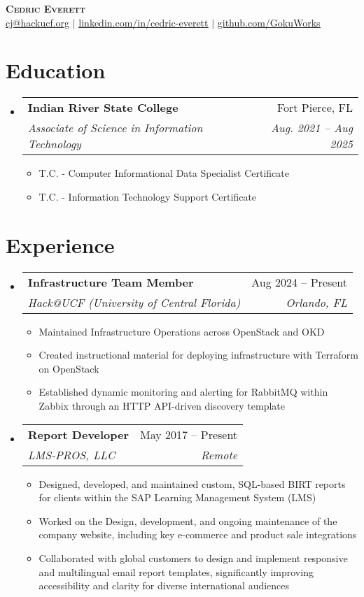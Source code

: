 \documentclass[letterpaper,11pt]{article}
\makeatletter
\newcommand{\resumeItem}[1]{
  \item\small{
    {#1 \vspace{-2pt}}
  }
}
\newcommand{\resumeSubheading}[4]{
  \vspace{-2pt}\item
    \begin{tabular*}{0.97\textwidth}[t]{l@{\extracolsep{\fill}}r}
      \textbf{#1} & #2 \\
      \textit{\small#3} & \textit{\small #4} \\
    \end{tabular*}\vspace{-7pt}
}
\newcommand{\resumeSubHeadingListStart}{\begin{itemize}[leftmargin=0.15in, label={}]}
\newcommand{\resumeSubHeadingListEnd}{\end{itemize}}
\newcommand{\resumeItemListStart}{\begin{itemize}}
\newcommand{\resumeItemListEnd}{\end{itemize}\vspace{-5pt}}
\makeatother
\begin{document}
\begin{center}
    \textbf{\Huge \scshape Cedric Everett} \\ \vspace{1pt}
    \small \href{mailto:cj@hackucf.org}{\underline{cj@hackucf.org}} $|$ 
    \href{https://www.linkedin.com/in/cedric-everett/}{\underline{linkedin.com/in/cedric-everett}} $|$
    \href{https://github.com/GokuWorks}{\underline{github.com/GokuWorks}}
\end{center}


\section{Education}
  \resumeSubHeadingListStart
    \resumeSubheading
      {Indian River State College}{Fort Pierce, FL}
      {Associate of Science in Information Technology}{Aug. 2021 -- Aug 2025}
      \resumeItemListStart
        \resumeItem{T.C. - Computer Informational Data Specialist Certificate}
        \resumeItem{T.C. - Information Technology Support Certificate}
      \resumeItemListEnd
  \resumeSubHeadingListEnd


\section{Experience}
  \resumeSubHeadingListStart

    \resumeSubheading
      {Infrastructure Team Member}{Aug 2024 -- Present}
      {Hack@UCF (University of Central Florida)}{Orlando, FL}
      \resumeItemListStart
        \resumeItem{Maintained Infrastructure Operations across OpenStack and OKD}
        \resumeItem{Created instructional material for deploying infrastructure with Terraform on OpenStack}
        \resumeItem{Established dynamic monitoring and alerting for RabbitMQ within Zabbix through an HTTP API-driven discovery template}
      \resumeItemListEnd

    \resumeSubheading
        {Report Developer}{May 2017 -- Present}
        {LMS-PROS, LLC}{Remote}
        \resumeItemListStart
          \resumeItem{Designed, developed, and maintained custom, SQL-based BIRT reports for clients within the SAP Learning Management System (LMS)}
          \resumeItem{Worked on the Design, development, and ongoing maintenance of the company website, including key e-commerce and product sale integrations}
          \resumeItem{Collaborated with global customers to design and implement responsive and multilingual email report templates, significantly improving accessibility and clarity for diverse international audiences}
        \resumeItemListEnd
    \resumeSubHeadingListEnd
\end{document}
